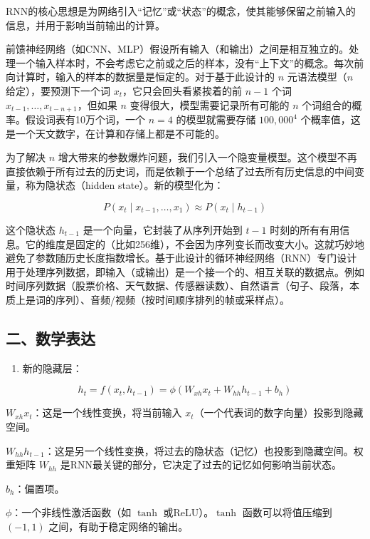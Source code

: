 RNN的核心思想是为网络引入``记忆''或``状态''的概念，使其能够保留之前输入的信息，并用于影响当前输出的计算。

前馈神经网络（如CNN、MLP）假设所有输入（和输出）之间是相互独立的。处理一个输入样本时，不会考虑它之前或之后的样本，没有``上下文''的概念。每次前向计算时，输入的样本的数据量是恒定的。对于基于此设计的 \(n\) 元语法模型（\(n\) 给定），要预测下一个词 \(x_t\)，它只会回头看紧挨着的前 \(n-1\) 个词 \(x_{t-1},\ldots,x_{t-n+1}\)，但如果 \(n\) 变得很大，模型需要记录所有可能的 \(n\) 个词组合的概率。假设词表有10万个词，一个 \(n=4\) 的模型就需要存储 \(100{,}000^4\) 个概率值，这是一个天文数字，在计算和存储上都是不可能的。

为了解决 \(n\) 增大带来的参数爆炸问题，我们引入一个隐变量模型。这个模型不再直接依赖于所有过去的历史词，而是依赖于一个总结了过去所有历史信息的中间变量，称为隐状态（hidden state）。新的模型化为：

\[
P(x_t \mid x_{t-1},\ldots,x_1) \approx P(x_t \mid h_{t-1})
\]

这个隐状态 \(h_{t-1}\) 是一个向量，它封装了从序列开始到 \(t-1\) 时刻的所有有用信息。它的维度是固定的（比如256维），不会因为序列变长而改变大小。这就巧妙地避免了参数随历史长度指数增长。基于此设计的循环神经网络（RNN）专门设计用于处理序列数据，即输入（或输出）是一个接一个的、相互关联的数据点。例如时间序列数据（股票价格、天气数据、传感器读数）、自然语言（句子、段落，本质上是词的序列）、音频/视频（按时间顺序排列的帧或采样点）。

\hypertarget{ux4e8cux6570ux5b66ux8868ux8fbe}{%
\subsection{二、数学表达}\label{ux4e8cux6570ux5b66ux8868ux8fbe}}

\begin{enumerate}
\def\labelenumi{\arabic{enumi}.}
\tightlist
\item
  新的隐藏层：
\end{enumerate}

\[
h_t=f(x_t,h_{t-1})=\phi(W_{xh}x_t+W_{hh}h_{t-1}+b_h)
\]

\(W_{xh}x_t\)：这是一个线性变换，将当前输入 \(x_t\)（一个代表词的数字向量）投影到隐藏空间。

\(W_{hh}h_{t-1}\)：这是另一个线性变换，将过去的隐状态（记忆）也投影到隐藏空间。权重矩阵 \(W_{hh}\) 是RNN最关键的部分，它决定了过去的记忆如何影响当前状态。

\(b_h\)：偏置项。

\(\phi\)：一个非线性激活函数（如 \(\tanh\) 或ReLU）。\(\tanh\) 函数可以将值压缩到 \((-1,1)\) 之间，有助于稳定网络的输出。

